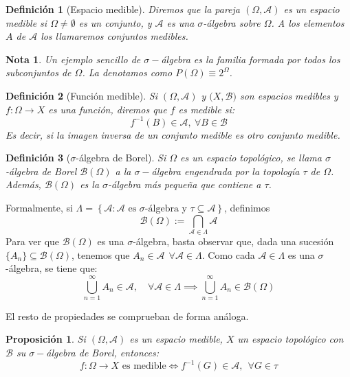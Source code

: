 \documentclass[11pt, a4paper]{article}
\theoremstyle{theorem-style}
\newtheorem{nprop}{Proposición}[section]
\theoremstyle{definition-style}
\newtheorem{ndef}{Definición}[section]
\theoremstyle{remark-style}
\newtheorem*{nota}{Nota}
\theoremstyle{example-style}
\begin{document}
\begin{ndef}[Espacio medible] Diremos que la pareja $(\Omega, \mathcal A)$ es un espacio medible si $\Omega \ne \emptyset$ es un conjunto, y $\mathcal A$ es una $\sigma$-álgebra sobre $\Omega$. A los elementos $A$ de $\mathcal{A}$ los llamaremos conjuntos medibles.
\end{ndef}

\begin{nota}
	Un ejemplo sencillo de $\sigma-$álgebra es la familia formada por todos los subconjuntos de $\Omega$. La denotamos como $P(\Omega) \equiv 2^\Omega$.
\end{nota}

\begin{ndef}[Función medible]
	Si $(\Omega,\mathcal{A}) $ y $(X,\mathcal{B)}$ son espacios medibles y \mbox{$f: \Omega \to X$} es una función, diremos que $f$ es medible si:
	\[
	f^{-1}(B) \in \mathcal A, \ \forall B \in \mathcal{B}
	\]
	Es decir, si la imagen inversa de un conjunto medible es otro conjunto medible.
\end{ndef}

\begin{ndef}[$\sigma$-álgebra de Borel] Si $\Omega$ es un espacio topológico, se llama $\sigma$-álgebra de Borel $\mathcal B(\Omega)$ a la $\sigma-$álgebra engendrada por la topología $\tau$ de $\Omega$. Además, $\mathcal B(\Omega)$ es la $\sigma$-álgebra más pequeña que contiene a $\tau$.
\end{ndef}

Formalmente, si $\Lambda = \left\{ \mathcal A : \mathcal A \text{ es } \sigma \text{-álgebra y } \tau \subseteq \mathcal A \right\}$, definimos $$\mathcal B(\Omega) := \bigcap_{\mathcal A \in \Lambda} \mathcal A$$ 
Para ver que $\mathcal B(\Omega)$ es una $\sigma$-álgebra, basta observar que, dada una sucesión \mbox{$\{A_n\} \subseteq \mathcal B(\Omega)$}, tenemos que $A_n \in \mathcal A \ \ \forall \mathcal A \in \Lambda$. Como cada $\mathcal A \in \Lambda$ es una $\sigma$-álgebra, se tiene que: $$\bigcup_{n=1}^\infty A_n \in \mathcal A, \quad \forall \mathcal A \in \Lambda \implies \bigcup_{n=1}^\infty A_n \in \mathcal B(\Omega)$$

El resto de propiedades se comprueban de forma análoga.

\begin{nprop}Si $(\Omega,\mathcal{A})$ es un espacio medible, $X$ un espacio topológico con $\mathcal B$ su $\sigma-$álgebra de Borel, entonces:
\[
f: \Omega \to X \text{ es medible} \iff f^{-1}(G) \in \mathcal{A}, \ \ \forall G \in \tau
\]

\end{nprop}
\end{document}
